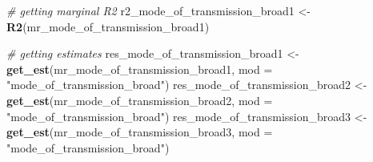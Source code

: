 \documentclass[
]{article}
\newenvironment{Shaded}{\begin{snugshade}}{\end{snugshade}}
\newcommand{\CommentTok}[1]{\textcolor[rgb]{0.56,0.35,0.01}{\textit{#1}}}
\newcommand{\DataTypeTok}[1]{\textcolor[rgb]{0.13,0.29,0.53}{#1}}
\newcommand{\KeywordTok}[1]{\textcolor[rgb]{0.13,0.29,0.53}{\textbf{#1}}}
\newcommand{\NormalTok}[1]{#1}
\newcommand{\StringTok}[1]{\textcolor[rgb]{0.31,0.60,0.02}{#1}}
\begin{document}
\begin{Shaded}
\begin{Highlighting}[]
\CommentTok{# getting marginal R2}
\NormalTok{r2_mode_of_transmission_broad1 <-}\StringTok{ }\KeywordTok{R2}\NormalTok{(mr_mode_of_transmission_broad1)}

\CommentTok{# getting estimates}
\NormalTok{res_mode_of_transmission_broad1 <-}\StringTok{ }\KeywordTok{get_est}\NormalTok{(mr_mode_of_transmission_broad1, }\DataTypeTok{mod =} \StringTok{"mode_of_transmission_broad"}\NormalTok{)}
\NormalTok{res_mode_of_transmission_broad2 <-}\StringTok{ }\KeywordTok{get_est}\NormalTok{(mr_mode_of_transmission_broad2, }\DataTypeTok{mod =} \StringTok{"mode_of_transmission_broad"}\NormalTok{)}
\NormalTok{res_mode_of_transmission_broad3 <-}\StringTok{ }\KeywordTok{get_est}\NormalTok{(mr_mode_of_transmission_broad3, }\DataTypeTok{mod =} \StringTok{"mode_of_transmission_broad"}\NormalTok{)}


\end{Highlighting}
\end{Shaded}
\end{document}
